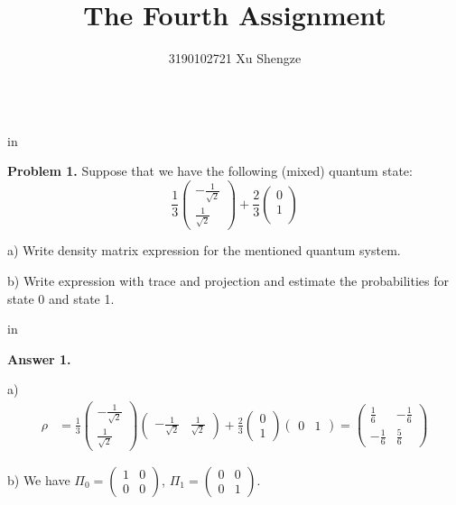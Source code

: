 \documentclass[11pt]{article}
\begin{document}
\title{{\bf The Fourth Assignment}}
\author{3190102721 Xu Shengze}
\date{}
\maketitle

\begin{tabular*}{13cm}{r}
\hline
\end{tabular*}

 in

{\bf Problem 1.} Suppose that we have the following (mixed) quantum state: $$\frac{1}{3}\begin{pmatrix}
	-\frac{1}{\sqrt{2}}\\
	\frac{1}{\sqrt{2}}
\end{pmatrix}+\frac{2}{3}\begin{pmatrix}
0\\
1\\
\end{pmatrix}$$

a) Write density matrix expression for the mentioned quantum system.

b) Write expression with trace and projection and estimate the probabilities for state 0 and state 1.

 in

{\bf Answer 1.} 

a) $$
\begin{aligned}
\rho&=\frac{1}{3}\begin{pmatrix}
	-\frac{1}{\sqrt{2}}\\
	\frac{1}{\sqrt{2}}
\end{pmatrix}\begin{pmatrix}
	-\frac{1}{\sqrt{2}}&\frac{1}{\sqrt{2}}
\end{pmatrix}+\frac{2}{3}\begin{pmatrix}
	0\\
	1
\end{pmatrix}\begin{pmatrix}
	0&1
\end{pmatrix}=\begin{pmatrix}
	\frac{1}{6}&-\frac{1}{6}\\
	-\frac{1}{6}&\frac{5}{6}
\end{pmatrix}
\end{aligned}
$$

b) We have $\Pi_0=\begin{pmatrix}
	1&0\\
	0&0
\end{pmatrix}$, $\Pi_1=\begin{pmatrix}
0&0\\
0&1
\end{pmatrix}$.
\end{document}
